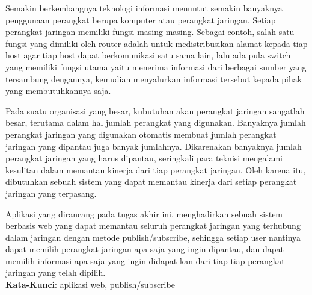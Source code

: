 \begin{abstrak}
		Semakin berkembangnya teknologi informasi menuntut semakin banyaknya penggunaan perangkat berupa komputer atau perangkat jaringan. Setiap perangkat jaringan memiliki fungsi masing-masing. Sebagai contoh, salah satu fungsi yang dimiliki oleh router adalah untuk medistribusikan alamat kepada tiap host agar tiap host dapat berkomunikasi satu sama lain, lalu ada pula switch yang memiliki fungsi utama yaitu menerima informasi dari berbagai sumber yang tersambung dengannya, kemudian menyalurkan informasi tersebut kepada pihak yang membutuhkannya saja.
		
		Pada suatu organisasi yang besar, kubutuhan akan perangkat jaringan sangatlah besar, terutama dalam hal jumlah perangkat yang digunakan. Banyaknya jumlah perangkat jaringan yang digunakan otomatis membuat jumlah perangkat jaringan yang dipantau juga banyak jumlahnya. Dikarenakan banyaknya jumlah perangkat jaringan yang harus dipantau, seringkali para teknisi mengalami kesulitan dalam memantau kinerja dari tiap perangkat jaringan. Oleh karena itu, dibutuhkan sebuah sistem yang dapat memantau kinerja dari setiap perangkat jaringan yang terpasang.
		
		Aplikasi yang dirancang pada tugas akhir ini, menghadirkan sebuah sistem berbasis web yang dapat memantau seluruh perangkat jaringan yang terhubung dalam jaringan dengan metode publish/subscribe, sehingga setiap user nantinya dapat memilih perangkat jaringan apa saja yang ingin dipantau, dan dapat memilih informasi apa saja yang ingin didapat kan dari tiap-tiap perangkat jaringan yang telah dipilih. \\

	\noindent \textbf{Kata-Kunci}: aplikasi web, publish/subscribe
\end{abstrak}
\newpage
